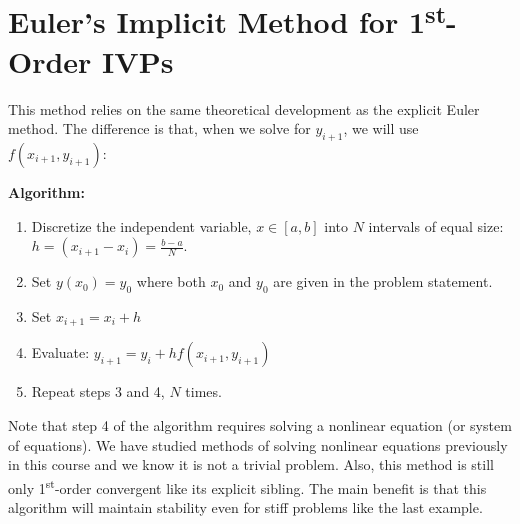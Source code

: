 \section{Euler's Implicit Method for 1\textsuperscript{st}-Order IVPs}
This method relies on the same theoretical development as the explicit Euler method.  The difference is that, when we solve for $y_{i+1}$, we will use $f(x_{i+1},y_{i+1})$:

\vspace{0.2cm}

\noindent\textbf{Algorithm:}
\begin{enumerate}
\item Discretize the independent variable, $x \in [a,b]$ into $N$ intervals of equal size: $h = (x_{i+1}-x_i) = \frac{b-a}{N}$.
\item Set $y(x_0) = y_0$ where both $x_0$ and $y_0$ are given in the problem statement.
\item Set $x_{i+1} = x_i + h$
\item Evaluate: $y_{i+1} = y_i + hf(x_{i+1},y_{i+1})$
\item Repeat steps 3 and 4, $N$ times.
\end{enumerate}
Note that step 4 of the algorithm requires solving a nonlinear equation (or system of equations).  We have studied methods of solving nonlinear equations previously in this course and we know it is not a trivial problem.  Also, this method is still only 1\textsuperscript{st}-order convergent like its explicit sibling.  The main benefit is that this algorithm will maintain stability even for stiff problems like the last example.

